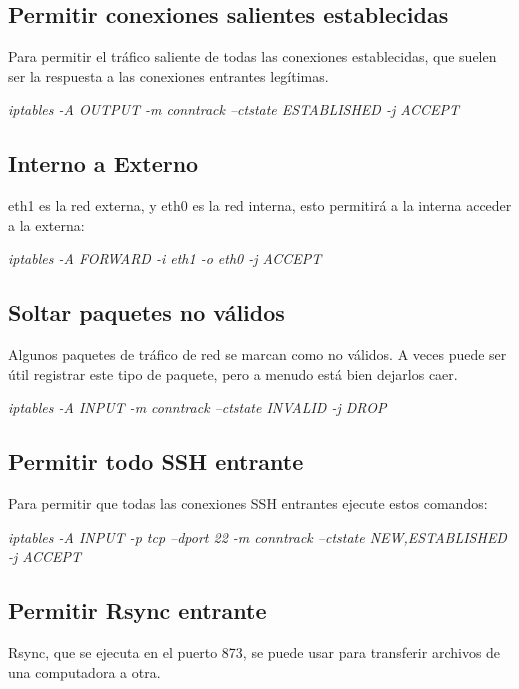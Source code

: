 \documentclass{article}
\begin{document}
\subsection*{Permitir conexiones salientes establecidas}
Para permitir el tráfico saliente de todas las conexiones establecidas, que suelen ser la respuesta a las conexiones entrantes legítimas.

\begin{center}
	\textit{ iptables -A OUTPUT -m conntrack --ctstate ESTABLISHED -j ACCEPT
}
\end{center}

\subsection*{Interno a Externo}
eth1 es la red externa, y eth0 es la red interna, esto permitirá a la interna acceder a la externa:

\begin{center}
	\textit{ iptables -A FORWARD -i eth1 -o eth0 -j ACCEPT}
\end{center}

\subsection*{Soltar paquetes no válidos}
Algunos paquetes de tráfico de red se marcan como no válidos. A veces puede ser útil registrar este tipo de paquete, pero a menudo está bien dejarlos caer. 

\begin{center}
	\textit{ iptables -A INPUT -m conntrack --ctstate INVALID -j DROP}
\end{center}

\subsection*{Permitir todo SSH entrante}
Para permitir que todas las conexiones SSH entrantes ejecute estos comandos:

 \begin{center}
 	\textit{iptables -A INPUT -p tcp --dport 22 -m conntrack --ctstate NEW,ESTABLISHED -j ACCEPT}
 \end{center}


\subsection*{Permitir Rsync entrante}
Rsync, que se ejecuta en el puerto 873, se puede usar para transferir archivos de una computadora a otra.
\end{document}
